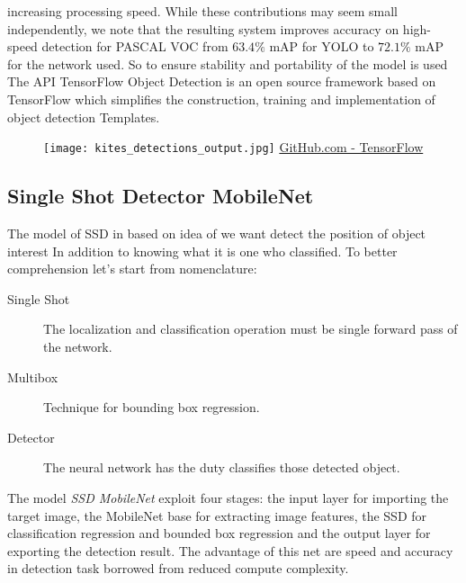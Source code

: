 increasing processing speed. While these contributions may seem small
independently, we note that the resulting system improves accuracy on high-speed
detection for PASCAL VOC from $63.4\%$ mAP for YOLO to $72.1\%$ mAP for the
network used.\cite{liu2016ssd,Huang2016SpeedAccuracyTF}
So to ensure stability and portability of the model is used The API TensorFlow
Object Detection is an open source framework based on TensorFlow which
simplifies the construction, training and implementation of object detection
Templates.\cite{objectdetectionAPI}
%
%
\begin{figure}[!h]
	\centering
	\texttt{[image: kites\_detections\_output.jpg]}
	{\href{https://github.com/tensorflow/models/tree/master/research/object_detection}{GitHub.com - TensorFlow}}
	\label{fig:kites-detections-output}
\end{figure}
%
%
\subsection{Single Shot Detector MobileNet}
\label{ssec:single-shot-detector}
The model of SSD in based on idea of we want detect the position of object
interest In addition to knowing what it is one who classified. To better
comprehension let's start from nomenclature:
\begin{description}
\item[Single Shot] The localization and classification operation must be single forward pass of the network.
\item[Multibox] Technique for bounding box regression.
\item[Detector] The neural network has the duty classifies those detected object.
\end{description}
%
The model \emph{SSD MobileNet} exploit four stages: the input layer for
importing the target image, the MobileNet base for extracting image features,
the SSD for classification regression and bounded box regression and the output
layer for exporting the detection result.\cite{Li_2018} 
The advantage of this net are speed and accuracy in detection task borrowed from
reduced compute complexity.
























